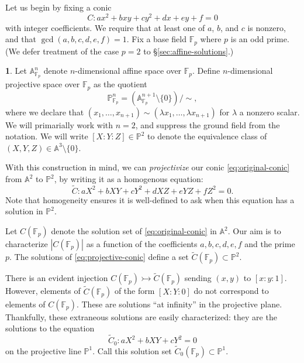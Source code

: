 \documentclass[10pt,a4paper]{amsart}
\numberwithin{equation}{section}
\numberwithin{figure}{section}
\theoremstyle{definition}
\theoremstyle{remark}
\theoremstyle{plain}
\theoremstyle{plain}
\theoremstyle{definition}
\newtheorem{defn}{\protect\definitionname}[section]
\theoremstyle{plain}
\theoremstyle{plain}
\providecommand{\definitionname}{Definition}
\newcommand{\A}{\mathbb{A}}
\renewcommand{\P}{\mathbb{P}}
\newcommand{\F}{\mathbb{F}}
\begin{document}
    Let us begin by fixing a conic
    \begin{equation}\label{eq:original-conic} 
        C \colon ax^2 + bxy + cy^2 + dx + ey + f = 0 
    \end{equation} 
    with integer coefficients. We require that at least one of 
    $a$, $b$, and $c$ is nonzero, and that $\gcd(a,b,c,d,e,f)=1$.
    Fix a base field $\F_p$ where $p$ is an odd prime. (We defer treatment of the case $p = 2$ to \S\ref{sec:affine-solutions}.)
    \begin{defn}
        Let $\A^n_{\F_p}$ denote $n$-dimensional affine space over $\F_p$. Define 
        $n$-dimensional projective space over $\F_p$ as the quotient
        \[ \P^n_{\F_p} = (\A^{n+1}_{\F_p}\setminus \{0\})/{\sim}, \]
        where we declare that $(x_1,\ldots,x_{n+1}) \sim 
        (\lambda x_1,\ldots,\lambda x_{n+1})$ for $\lambda$ a nonzero scalar. We
        will primarially work with $n = 2$, and suppress the ground field from the 
        notation. We will write $[X:Y:Z]\in \P^2$ to denote the equivalence 
        class of $(X,Y,Z)\in \A^3 \setminus \{0\}$.
    \end{defn}

    With this construction in mind, we can \emph{projectivize} our conic
    \eqref{eq:original-conic} from $\A^2$ to $\P^2$, by writing it as a 
    homogenous equation: 
    \begin{equation}\label{eq:projective-conic} 
        \widetilde{C} \colon aX^2 + bXY + cY^2 + dXZ + eYZ + fZ^2 = 0. 
    \end{equation}
    Note that homogeneity ensures it is well-defined to ask when this
    equation has a solution in $\P^2$.

    Let $C(\F_p)$ denote the solution set of \eqref{eq:original-conic} in $\A^2$. Our aim
    is to characterize $|C(\F_p)|$ as a function of the coefficients $a,b,c,d,e,f$ and 
    the prime $p$. The solutions of \eqref{eq:projective-conic} define a set
    $\widetilde{C}(\F_p) \subset \P^2$.

    There is an evident injection $C(\F_p) \rightarrowtail \widetilde{C}(\F_p)$ sending $(x,y)$ to
    $[x:y:1]$. However, elements of $\widetilde{C}(\F_p)$ of the form $[X:Y:0]$ do not 
    correspond to elements of $C(\F_p)$. 
    These are solutions ``at infinity'' in the projective plane.
    Thankfully, these extraneous solutions are easily characterized: they are the
    solutions to the equation
    \begin{equation}\label{eq:projective-conic-at-infinity} 
        \widetilde{C}_0 \colon aX^2 + bXY + cY^2 = 0
    \end{equation} 
    on the projective line $\P^1$. Call this solution set $\widetilde{C}_0(\F_p)\subset \P^1$.  
\end{document}
